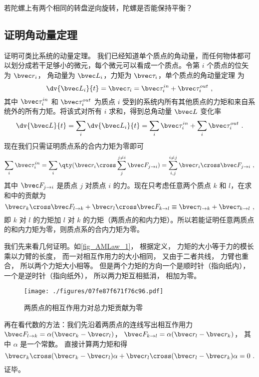 \begin{exercise}{}
若陀螺上有两个相同的转盘逆向旋转，陀螺是否能保持平衡？
\end{exercise}

\subsection{证明角动量定理}
证明可类比系统的动量定理。 我们已经知道单个质点的角动量，而任何物体都可以划分成若干足够小的微元，每个微元可以看成一个质点。令第 $i$ 个质点的位矢为 $\bvec r_i$， 角动量为 $\bvec L_i$，力矩为 $\bvec \tau_i$，单个质点的角动量定理 为
\begin{equation}
\dv{\bvec L_i}{t} = \bvec \tau_i = \bvec \tau_i^{in} + \bvec \tau_i^{out}~,
\end{equation}
其中 $\bvec \tau_i^{in}$ 和 $\bvec \tau_i^{out}$ 为质点 $i$ 受到的系统内所有其他质点的力矩和来自系统外的所有力矩。将该式对所有 $i$ 求和，得到总角动量 $\bvec L$ 变化率
\begin{equation}
\dv{\bvec L}{t} =\sum_i\dv{\bvec L_i}{t} = \sum_i\bvec \tau_i^{in} + \sum_i\bvec \tau_i^{out}~.
\end{equation}
现在我们只需证明质点系的合内力矩为零即可
\begin{equation}
\sum_i\bvec \tau_i^{in} = \sum_i \qty(\bvec r_i\cross\sum_j^{j\ne i}\bvec F_{j\to i}) = \sum_{i,j}^{i\ne j} \bvec r_i\cross\bvec F_{j\to i}~,
\end{equation}
其中 $\bvec F_{j\to i}$ 是质点 $j$ 对质点 $i$ 的力。现在只考虑任意两个质点 $k$ 和 $l$，在求和中的贡献为
\begin{equation}
\bvec r_k\cross\bvec F_{l\to k} + \bvec r_l\cross\bvec F_{k\to l} \equiv \bvec \tau_{l\to k}+ \bvec \tau_{k\to l}~,
\end{equation}
即 $k$ 对 $l$ 的力矩加 $l$ 对 $k$ 的力矩（两质点的和内力矩）。所以若能证明任意两质点的和内力矩为零，则质点系的合内力矩为零。

我们先来看几何证明。如\autoref{fig_AMLaw_1}， 根据定义， 力矩的大小等于力的模长乘以力臂的长度， 而一对相互作用力的大小相同， 又由于二者共线， 力臂也重合， 所以两个力矩大小相等。 但是两个力矩的方向一个是顺时针（指向纸内）， 一个是逆时针（指向纸外）， 所以两力矩互相抵消， 相加为零。

\begin{figure}[ht]
\centering
\texttt{[image: ./figures/07fe87f671f76c96.pdf]}
\caption{两质点的相互作用力对总力矩贡献为零}\label{fig_AMLaw_1}
\end{figure}

再在看代数的方法：我们先沿着两质点的连线写出相互作用力 $\bvec F_{l\to k} = \alpha(\bvec r_k - \bvec r_l)$， $\bvec F_{k\to l} = \alpha(\bvec r_l - \bvec r_k)$， 其中 $\alpha$ 是一个常数。 直接计算两力矩和得
\begin{equation}
\bvec r_k \cross (\bvec r_k - \bvec r_l)\alpha + \bvec r_l \cross (\bvec r_l - \bvec r_k)\alpha = 0~.
\end{equation}
证毕。
